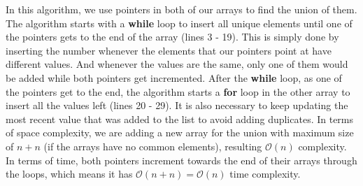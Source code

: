     In this algorithm, we use pointers in both of our arrays to find the union of them.
    The algorithm starts with a \textbf{while} loop to insert all unique elements until one of the pointers gets to the end of the array (lines 3 - 19).
    This is simply done by inserting the number whenever the elements that our pointers point at have different values.
    And whenever the values are the same, only one of them would be added while both pointers get incremented. After the \textbf{while} loop,
    as one of the pointers get to the end, the algorithm starts a \textbf{for} loop in the other array to insert all the values left (lines 20 - 29).
    It is also necessary to keep updating the most recent value that was added to the list to avoid adding duplicates. In terms of space complexity, we are adding a new array 
    for the union with maximum size of $n+n$ (if the arrays have no common elements), resulting $\mathcal{O}(n)$ complexity. In terms of time, both pointers
    increment towards the end of their arrays through the loops, which means it has $\mathcal{O}(n+n)=\mathcal{O}(n)$ time complexity. 
    
